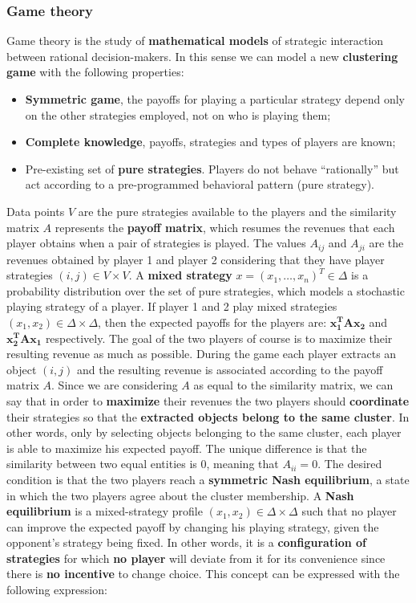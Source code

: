 \subsubsection{Game theory}
Game theory is the study of \textbf{mathematical models} of strategic interaction between rational decision-makers. In this sense we can model a new \textbf{clustering game} with the following properties:
\begin{itemize}
	\item \textbf{Symmetric game}, the payoffs for playing a particular strategy depend only on the other strategies employed, not on who is playing them;
	\item \textbf{Complete knowledge}, payoffs, strategies and types of players are known;
	\item Pre-existing set of \textbf{pure strategies}. Players do not behave “rationally” but act according to a pre-programmed behavioral pattern (pure strategy).
\end{itemize}
Data points $V$ are the pure strategies available to the players and the similarity matrix $A$ represents the \textbf{payoff matrix}, which resumes the revenues that each player obtains when a pair of strategies is played. The values $A_{ij}$ and $A_{ji}$ are the revenues obtained by player 1 and player 2 considering that they have player strategies $(i,j) \in V\times V$.
A \textbf{mixed strategy} $x=(x_1, \dots, x_n)^T \in \Delta$ is a probability distribution over the set of pure strategies, which models a stochastic playing strategy of a player. If player 1 and 2 play mixed strategies $(x_1, x_2) \in \Delta \times \Delta$, then the expected payoffs for the players are: $\mathbf{x_1^TAx_2}$ and $\mathbf{x_2^TAx_1}$ respectively.
The goal of the two players of course is to maximize their resulting revenue as much as possible. During the game each player extracts an object $(i,j)$ and the resulting revenue is associated
according to the payoff matrix $A$. Since we are considering $A$ as equal to the similarity matrix, we can say that in order to \textbf{maximize} their revenues the two players should \textbf{coordinate} their strategies so that the \textbf{extracted objects belong to the same cluster}. In other words, only by selecting objects belonging to the same cluster, each player is able to maximize his expected payoff. The unique difference is that the similarity between two equal entities is $0$, meaning that $A_{ii} = 0$. The desired condition is that the two players reach a \textbf{symmetric Nash equilibrium}, a state in which the two players agree about the cluster membership. A \textbf{Nash equilibrium} is a mixed-strategy profile $(x_1,x_2)\in \Delta\times \Delta$ such that no player can improve the expected payoff by changing his playing strategy, given the opponent's strategy being fixed. In other words, it is a \textbf{configuration of strategies} for which \textbf{no player} will deviate from it for its convenience since there is \textbf{no incentive} to change choice. This concept can be expressed with the following expression:
